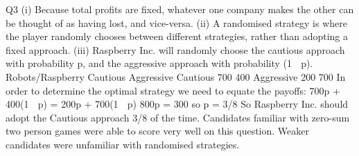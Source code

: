 \documentclass[a4paper,12pt]{article}
\begin{document}


  Q3 (i) Because total profits are fixed, whatever one company makes the other can be
thought of as having lost, and vice-versa.
(ii) A randomised strategy is where the player randomly chooses between
different strategies, rather than adopting a fixed approach.
(iii) Raspberry Inc. will randomly choose the cautious approach with probability p,
and the aggressive approach with probability (1  p).
Robots/Raspberry Cautious Aggressive
Cautious 700 400
Aggressive 200 700
In order to determine the optimal strategy we need to equate the payoffs:
  700p + 400(1  p) = 200p + 700(1  p)
800p = 300
so p = 3/8
So Raspberry Inc. should adopt the Cautious approach 3/8 of the time.
\newpage
Candidates familiar with zero-sum two person games were able to score very
well on this question. Weaker candidates were unfamiliar with randomised
strategies.
\end{document}
